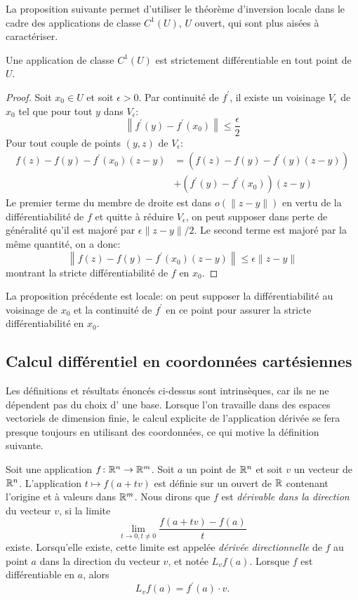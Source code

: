 La proposition suivante permet d'utiliser le théorème d'inversion locale dans le cadre des applications de classe $C^1(U)$,
 $U$ ouvert, qui sont plus aisées à caractériser.
\begin{fprop}
Une application de classe $C^1(U)$ est strictement différentiable en tout point de $U$.
\end{fprop}
\begin{proof}
Soit $x_0\in U$ et soit $\epsilon > 0$. Par continuité de $f^\prime$, il existe un voisinage $V_\epsilon$ de 
$x_0$ tel que pour tout $y$ dans $V_\epsilon$:
\[
\left\| f^{\prime}(y)-f^\prime(x_0) \right\| \leq \frac{\epsilon}{2} 
\]
Pour tout couple de points $(y,z)$ de $V_\epsilon$:
\begin{align*}
f(z)-f(y)-f^\prime(x_0)(z-y) & = \left(f(z)-f(y)-f^\prime(y)(z-y) \right)  \\
& + \left(f^\prime(y)-f^\prime(x_0)\right)(z-y)
\end{align*}
Le premier terme du membre de droite est dans $o(\|z-y\|)$ en vertu de la différentiabilité de $f$ et quitte à réduire $V_\epsilon$, 
on peut supposer dans perte de généralité qu'il est majoré par $\epsilon \|z-y\| /2$. 
Le second terme est majoré par la même quantité, on a donc:
\[
\left\|f(z)-f(y)-f^\prime(x_0)(z-y)\right \| \leq  \epsilon \|z-y\|
\]
montrant la stricte différentiabilité de $f$ en $x_0$.
\end{proof}
La proposition précédente est locale: on peut supposer la différentiabilité au voisinage de $x_0$ et la 
continuité de $f^\prime$ en ce point pour assurer la stricte différentiabilité en $x_0$.



\subsection{Calcul différentiel en coordonnées cartésiennes}

Les définitions et résultats énoncés ci-dessus sont intrinsèques, car ils ne ne dépendent pas du choix 
d' une base. Lorsque l'on travaille dans des espaces vectoriels de dimension finie, le calcul explicite de l'application dérivée se fera presque toujours en utilisant des coordonnées, ce qui motive
la définition suivante. 

\begin{defn}
Soit une application $f \colon \mathbb R^n \to \mathbb R^m$. Soit $a$ un point de $\mathbb R^n$ et soit $v$ un vecteur de $\mathbb R^n$. L'application $t \mapsto f(a+t v)$ est définie sur un ouvert de $\mathbb R$ 
contenant l'origine et à valeurs dans $\mathbb R^m$. Nous dirons que $f$ est \textit{dérivable dans la direction} du vecteur $v$, si la limite 
\[\lim_{t \rightarrow 0, t \neq 0} \frac{f(a+tv)-f(a)}{t}\]
existe. Lorsqu'elle existe, cette limite est appelée \textit{dérivée directionnelle} de $f$ au point $a$ dans la direction du vecteur $v$, et notée $L_v f(a)$. Lorsque $f$ est différentiable en $a$, alors
\[L_v f(a)=f^\prime(a) \cdot v.\]
\end{defn}

